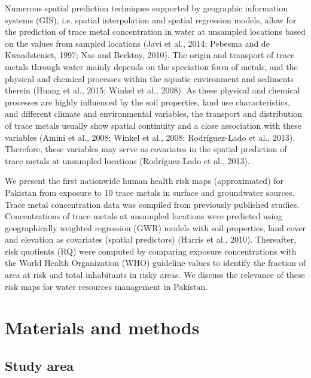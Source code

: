 Numerous spatial prediction techniques supported by geographic information systems (GIS), i.e. spatial interpolation and spatial regression models, allow for the prediction of trace metal concentration in water at unsampled locations based on the values from sampled locations (Javi et al., 2014; Pebesma and de Kwaadsteniet, 1997; Nas and Berktay, 2010). The origin and transport of trace metals through water mainly depends on the speciation form of metals, and the physical and chemical processes within the aquatic environment and sediments therein (Huang et al., 2015; Winkel et al., 2008). As these physical and chemical processes are highly influenced by the soil properties, land use characteristics, and different climate and environmental variables, the transport and distribution of trace metals usually show spatial continuity and a close association with these variables (Amini et al., 2008; Winkel et al., 2008; Rodríguez-Lado et al., 2013). Therefore, these variables may serve as covariates in the spatial prediction of trace metals at unsampled locations (Rodríguez-Lado et al., 2013).

We present the first nationwide human health risk maps (approximated) for Pakistan from exposure to 10 trace metals in surface and groundwater sources. Trace metal concentration data was compiled from previously published studies. Concentrations of trace metals at unsampled locations were predicted using geographically weighted regression (GWR) models with soil properties, land cover and elevation as covariates (spatial predictors) (Harris et al., 2010). Thereafter, risk quotients (RQ) were computed by comparing exposure concentrations with the World Health Organization (WHO) guideline values to identify the fraction of area at risk and total inhabitants in risky areas. We discuss the relevance of these risk maps for water resources management in Pakistan.

\newpage

\section{Materials and methods}
\label{Material and methods}

\subsection{Study area}
\label{Study area}

